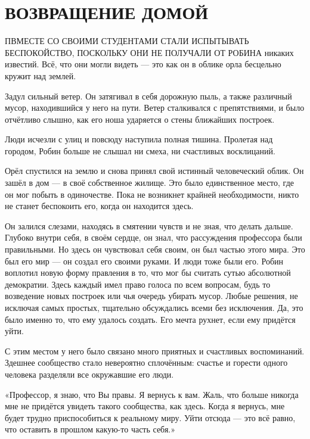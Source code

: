 \documentclass[a5paper, 9pt,
final, openany, twoside=true]{memoir}
\begin{document}
\chapter{ВОЗВРАЩЕНИЕ ДОМОЙ}
П{ ВМЕСТЕ СО СВОИМИ СТУДЕНТАМИ СТАЛИ ИСПЫТЫВАТЬ БЕСПОКОЙСТВО, ПОСКОЛЬКУ ОНИ НЕ ПОЛУЧАЛИ ОТ РОБИНА} никаких известий. Всё, что они могли видеть — это как он в облике орла бесцельно кружит над землей.

Задул сильный ветер. Он затягивал в себя дорожную пыль, а также различный мусор, находившийся у него на пути. Ветер сталкивался с препятствиями, и было отчётливо слышно, как его ноша ударяется о стены ближайших построек.

Люди исчезли с улиц и повсюду наступила полная тишина. Пролетая над городом, Робин больше не слышал ни смеха, ни счастливых восклицаний.

Орёл спустился на землю и снова принял свой истинный человеческий облик. Он зашёл в дом — в своё собственное жилище. Это было единственное место, где он мог побыть в одиночестве. Пока не возникнет крайней необходимости, никто не станет беспокоить его, когда он находится здесь.

Он залился слезами, находясь в смятении чувств и не зная, что делать дальше. Глубоко внутри себя, в своём сердце, он знал, что рассуждения профессора были правильными. Но здесь он чувствовал себя своим, он был частью этого мира. Это был его мир — он создал его своими руками. И люди тоже были его. Робин воплотил новую форму правления в то, что мог бы считать сутью абсолютной демократии. Здесь каждый имел право голоса по всем вопросам, будь то возведение новых построек или чья очередь убирать мусор. Любые решения, не исключая самых простых, тщательно обсуждались всеми без исключения. Да, это было именно то, что ему удалось создать. Его мечта рухнет, если ему придётся уйти.

С этим местом у него было связано много приятных и счастливых воспоминаний. Здешнее сообщество стало невероятно сплочённым: счастье и горести одного человека разделяли все окружавшие его люди.

«Профессор, я знаю, что Вы правы. Я вернусь к вам. Жаль, что больше никогда мне не придётся увидеть такого сообщества, как здесь. Когда я вернусь, мне будет трудно приспособиться к реальному миру. Уйти отсюда — это всё равно, что оставить в прошлом какую-то часть себя.»
\end{document}
